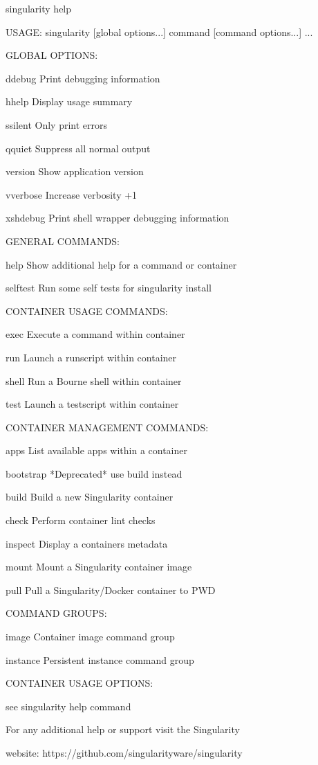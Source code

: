 \documentclass[letterpaper,10pt,english]{sphinxmanual}
\begin{document}
\begin{sphinxVerbatim}[commandchars=\\\{\}]
\PYGZdl{} singularity \PYGZhy{}\PYGZhy{}help

USAGE: singularity [global options...] \PYGZlt{}command\PYGZgt{} [command options...] ...


GLOBAL OPTIONS:

    \PYGZhy{}d\textbar{}\PYGZhy{}\PYGZhy{}debug    Print debugging information

    \PYGZhy{}h\textbar{}\PYGZhy{}\PYGZhy{}help     Display usage summary

    \PYGZhy{}s\textbar{}\PYGZhy{}\PYGZhy{}silent   Only print errors

    \PYGZhy{}q\textbar{}\PYGZhy{}\PYGZhy{}quiet    Suppress all normal output

       \PYGZhy{}\PYGZhy{}version  Show application version

    \PYGZhy{}v\textbar{}\PYGZhy{}\PYGZhy{}verbose  Increase verbosity +1

    \PYGZhy{}x\textbar{}\PYGZhy{}\PYGZhy{}sh\PYGZhy{}debug Print shell wrapper debugging information


GENERAL COMMANDS:

    help       Show additional help for a command or container

    selftest   Run some self tests for singularity install


CONTAINER USAGE COMMANDS:

    exec       Execute a command within container

    run        Launch a runscript within container

    shell      Run a Bourne shell within container

    test       Launch a testscript within container


CONTAINER MANAGEMENT COMMANDS:

    apps       List available apps within a container

    bootstrap  *Deprecated* use build instead

    build      Build a new Singularity container

    check      Perform container lint checks

    inspect    Display a container\PYGZsq{}s metadata

    mount      Mount a Singularity container image

    pull       Pull a Singularity/Docker container to \PYGZdl{}PWD


COMMAND GROUPS:

    image      Container image command group

    instance   Persistent instance command group


CONTAINER USAGE OPTIONS:

    see singularity help \PYGZlt{}command\PYGZgt{}

For any additional help or support visit the Singularity

website: https://github.com/singularityware/singularity
\end{sphinxVerbatim}
\end{document}
